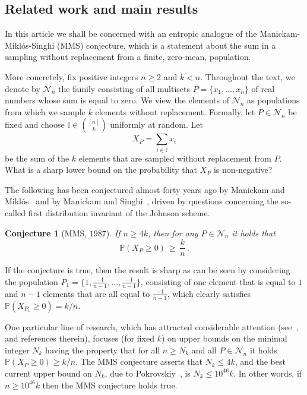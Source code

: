 \documentclass[11pt]{article}
\newtheorem{conjecture}{Conjecture}
\newcommand{\Prb}{\mathbb{P}}
\newcommand{\mbI}{\mathbb{I}}
\begin{document}
\subsection{Related work and main results}


In this article we shall be concerned with an entropic analogue of the Manickam-Mikl\'os-Singhi (MMS) conjecture, which is a statement about the sum in a sampling without replacement from a finite, zero-mean, population.  

More concretely, fix positive  integers $n\ge 2$ and $k<n$. Throughout the text, we denote by $\mathcal{N}_n$ the family    consisting of all 
multisets $P=\{x_1,\ldots,x_n\}$  of  real numbers whose sum is equal to zero. 
We view the elements of $\mathcal{N}_n$ as populations from which we sample $k$ elements without replacement. Formally, let  $P\in\mathcal{N}_n$ be fixed and choose   $\mbI\in \binom{[n]}{k}$  uniformly at random.  
Let   
\[
X_P = \sum_{i\in\mbI} x_i 
\]
be the sum of the $k$ elements that are sampled without replacement from $P$.  
What is a sharp lower bound on the probability that $X_P$ is non-negative? 

The following  has been conjectured almost forty years ago by Manickam and Mikl\'os~\cite{Manickam_Miklos} and by Manickam and Singhi~\cite{Manickam_Singhi}, driven by questions concerning the so-called first distribution invariant of the Johnson scheme. 

\begin{conjecture}[MMS, $1987$]\label{mms_conj}
If $n\ge 4k$, then for any $P\in\mathcal{N}_n$ it holds that  
\[
\Prb(X_P \ge 0) \,\ge\, \frac{k}{n} \, . 
\]
\end{conjecture}


If the conjecture is true, then the result is sharp as can be seen by considering the population $P_1 =\{1,\frac{-1}{n-1},\ldots,\frac{-1}{n-1}\}$, consisting of one element that is  equal to $1$ and $n-1$ elements 
that are all equal to $\frac{-1}{n-1}$, which clearly satisfies 
$\Prb(X_{P_1}\ge 0) = k/n$. 

One particular line of research, which has attracted considerable attention (see~\cite{AHS, Frankl, Pokrovskiy, Tyomkyn}, and references therein), focuses  (for fixed $k$) on upper bounds   on  the minimal integer $N_k$ having the property that for all $n\ge N_k$ and all  $P\in\mathcal{N}_n$ it holds $\Prb(X_P \ge 0) \ge k/n$. 
The MMS conjecture asserts that $N_k\le 4k$, and  
the best current upper bound on $N_k$,   due to Pokrovskiy~\cite{Pokrovskiy},  is $N_k \le 10^{46}k$. 
In other words, if $n\ge 10^{46}k$ then the MMS conjecture holds true. 
\end{document}
